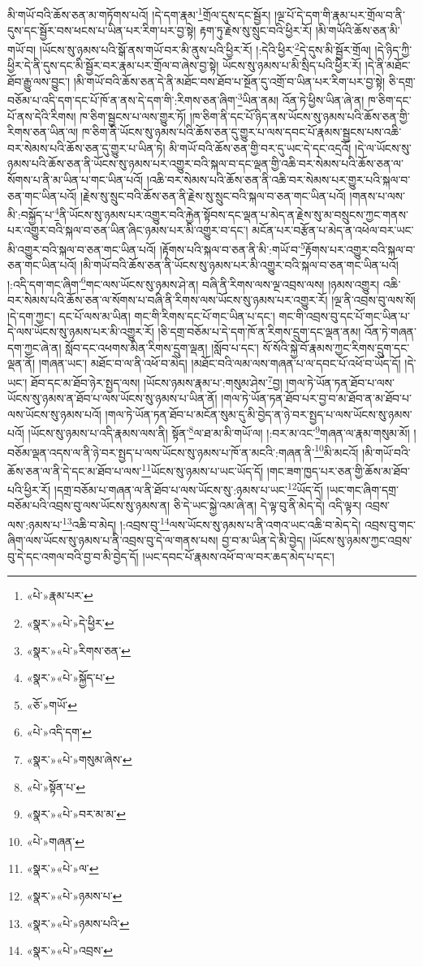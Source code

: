 མི་གཡོ་བའི་ཆོས་ཅན་མ་གཏོགས་པའོ། །དེ་དག་རྣམ་\footnote{«པེ་»རྣམ་པར་}གྲོལ་དུས་དང་སྦྱོར། །ལྔ་པོ་དེ་དག་གི་རྣམ་པར་གྲོལ་བ་ནི་དུས་དང་སྦྱོར་བས་ཕངས་པ་ཡིན་པར་རིག་པར་བྱ་སྟེ། རྟག་ཏུ་རྗེས་སུ་སྲུང་བའི་ཕྱིར་རོ། །མི་གཡོའི་ཆོས་ཅན་མི་གཡོ་བ། །ཡོངས་སུ་ཉམས་པའི་སྒོ་ནས་གཡོ་བར་མི་ནུས་པའི་ཕྱིར་རོ། །:དེའི་ཕྱིར་\footnote{«སྣར་»«པེ་»དེ་ཕྱིར་}དེ་དུས་མི་སྦྱོར་གྲོལ། །དེ་ཉིད་ཀྱི་ཕྱིར་དེ་ནི་དུས་དང་མི་སྦྱོར་བར་རྣམ་པར་གྲོལ་བ་ཞེས་བྱ་སྟེ། ཡོངས་སུ་ཉམས་པ་མི་སྲིད་པའི་ཕྱིར་རོ། །དེ་ནི་མཐོང་ཐོབ་རྒྱུ་ལས་བྱུང་། །མི་གཡོ་བའི་ཆོས་ཅན་དེ་ནི་མཐོང་བས་ཐོབ་པ་སྔོན་དུ་འགྲོ་བ་ཡིན་པར་རིག་པར་བྱ་སྟེ། ཅི་དགྲ་བཅོམ་པ་འདི་དག་དང་པོ་ཁོ་ན་ནས་དེ་དག་གི་:རིགས་ཅན་ཞིག་\footnote{«སྣར་»«པེ་»རིགས་ཅན་}ཡིན་ནམ། འོན་ཏེ་ཕྱིས་ཡིན་ཞེ་ན། ཁ་ཅིག་དང་པོ་ནས་དེའི་རིགས། ཁ་ཅིག་སྦྱངས་པ་ལས་གྱུར་ཏོ། །ཁ་ཅིག་ནི་དང་པོ་ཉིད་ནས་ཡོངས་སུ་ཉམས་པའི་ཆོས་ཅན་གྱི་རིགས་ཅན་ཡིན་ལ། ཁ་ཅིག་ནི་ཡོངས་སུ་ཉམས་པའི་ཆོས་ཅན་དུ་གྱུར་པ་ལས་དབང་པོ་རྣམས་སྦྱངས་པས་འཆི་བར་སེམས་པའི་ཆོས་ཅན་དུ་གྱུར་པ་ཡིན་ཏེ། མི་གཡོ་བའི་ཆོས་ཅན་གྱི་བར་དུ་ཡང་དེ་དང་འདྲའོ། །དེ་ལ་ཡོངས་སུ་ཉམས་པའི་ཆོས་ཅན་ནི་ཡོངས་སུ་ཉམས་པར་འགྱུར་བའི་སྐལ་བ་དང་ལྡན་གྱི་འཆི་བར་སེམས་པའི་ཆོས་ཅན་ལ་སོགས་པ་ནི་མ་ཡིན་པ་གང་ཡིན་པའོ། །འཆི་བར་སེམས་པའི་ཆོས་ཅན་ནི་འཆི་བར་སེམས་པར་གྱུར་པའི་སྐལ་བ་ཅན་གང་ཡིན་པའོ། །རྗེས་སུ་སྲུང་བའི་ཆོས་ཅན་ནི་རྗེས་སུ་སྲུང་བའི་སྐལ་བ་ཅན་གང་ཡིན་པའོ། །གནས་པ་ལས་མི་:བསྐྱོད་པ་\footnote{«སྣར་»«པེ་»སྐྱོད་པ་}ནི་ཡོངས་སུ་ཉམས་པར་འགྱུར་བའི་རྐྱེན་སྟོབས་དང་ལྡན་པ་མེད་ན་རྗེས་སུ་མ་བསྲུངས་ཀྱང་གནས་པར་འགྱུར་བའི་སྐལ་བ་ཅན་ཡིན་ཞིང་ཉམས་པར་མི་འགྱུར་བ་དང་། མངོན་པར་བརྩོན་པ་མེད་ན་འཕེལ་བར་ཡང་མི་འགྱུར་བའི་སྐལ་བ་ཅན་གང་ཡིན་པའོ། །རྟོགས་པའི་སྐལ་བ་ཅན་ནི་མི་:གཡོ་བ་\footnote{«ཅོ་»གཡོ་}རྟོགས་པར་འགྱུར་བའི་སྐལ་བ་ཅན་གང་ཡིན་པའོ། །མི་གཡོ་བའི་ཆོས་ཅན་ནི་ཡོངས་སུ་ཉམས་པར་མི་འགྱུར་བའི་སྐལ་བ་ཅན་གང་ཡིན་པའོ། །:འདི་དག་གང་ཞིག་\footnote{«པེ་»འདི་དག་}གང་ལས་ཡོངས་སུ་ཉམས་ཤེ་ན། བཞི་ནི་རིགས་ལས་ལྔ་འབྲས་ལས། །ཉམས་འགྱུར། འཆི་བར་སེམས་པའི་ཆོས་ཅན་ལ་སོགས་པ་བཞི་ནི་རིགས་ལས་ཡོངས་སུ་ཉམས་པར་འགྱུར་རོ། །ལྔ་ནི་འབྲས་བུ་ལས་སོ། །དེ་དག་ཀྱང་། དང་པོ་ལས་མ་ཡིན། གང་གི་རིགས་དང་པོ་གང་ཡིན་པ་དང་། གང་གི་འབྲས་བུ་དང་པོ་གང་ཡིན་པ་དེ་ལས་ཡོངས་སུ་ཉམས་པར་མི་འགྱུར་རོ། །ཅི་དགྲ་བཅོམ་པ་དེ་དག་ཁོ་ན་རིགས་དྲུག་དང་ལྡན་ནམ། འོན་ཏེ་གཞན་དག་ཀྱང་ཞེ་ན། སློབ་དང་འཕགས་མིན་རིགས་དྲུག་ལྡན། །སློབ་པ་དང་། སོ་སོའི་སྐྱེ་བོ་རྣམས་ཀྱང་རིགས་དྲུག་དང་ལྡན་ནོ། །གཞན་ཡང་། མཐོང་བ་ལ་ནི་འཕོ་བ་མེད། །མཐོང་བའི་ལམ་ལས་གཞན་པ་ལ་དབང་པོ་འཕོ་བ་ཡོད་དོ། །དེ་ཡང་། ཐོབ་དང་མ་ཐོབ་ཉེར་སྤྱད་ལས། །ཡོངས་ཉམས་རྣམ་པ་:གསུམ་ཤེས་\footnote{«སྣར་»«པེ་»གསུམ་ཞེས་}བྱ། །གལ་ཏེ་ཡོན་ཏན་ཐོབ་པ་ལས་ཡོངས་སུ་ཉམས་ན་ཐོབ་པ་ལས་ཡོངས་སུ་ཉམས་པ་ཡིན་ནོ། །གལ་ཏེ་ཡོན་ཏན་ཐོབ་པར་བྱ་བ་མ་ཐོབ་ན་མ་ཐོབ་པ་ལས་ཡོངས་སུ་ཉམས་པའོ། །གལ་ཏེ་ཡོན་ཏན་ཐོབ་པ་མངོན་སུམ་དུ་མི་བྱེད་ན་ཉེ་བར་སྤྱད་པ་ལས་ཡོངས་སུ་ཉམས་པའོ། །ཡོངས་སུ་ཉམས་པ་འདི་རྣམས་ལས་ནི། སྟོན་\footnote{«པེ་»སྟོན་པ་}ལ་ཐ་མ་མི་གཡོ་ལ། །:བར་མ་འང་\footnote{«སྣར་»«པེ་»བར་མ་མ་}གཞན་ལ་རྣམ་གསུམ་མོ། །བཅོམ་ལྡན་འདས་ལ་ནི་ཉེ་བར་སྤྱད་པ་ལས་ཡོངས་སུ་ཉམས་པ་ཁོ་ན་མངའི་:གཞན་ནི་\footnote{«པེ་»གཞན་}མི་མངའོ། །མི་གཡོ་བའི་ཆོས་ཅན་ལ་ནི་དེ་དང་མ་ཐོབ་པ་ལས་\footnote{«སྣར་»«པེ་»ལ་}ཡོངས་སུ་ཉམས་པ་ཡང་ཡོད་དོ། །གང་ཟག་ཁྱད་པར་ཅན་གྱི་ཆོས་མ་ཐོབ་པའི་ཕྱིར་རོ། །དགྲ་བཅོམ་པ་གཞན་ལ་ནི་ཐོབ་པ་ལས་ཡོངས་སུ་:ཉམས་པ་ཡང་\footnote{«སྣར་»«པེ་»ཉམས་པ་}ཡོད་དོ། །ཡང་གང་ཞིག་དགྲ་བཅོམ་པའི་འབྲས་བུ་ལས་ཡོངས་སུ་ཉམས་ན། ཅི་དེ་ཡང་སྐྱེ་འམ་ཞེ་ན། དེ་ལྟ་བུ་ནི་མེད་དེ། འདི་ལྟར། འབྲས་ལས་:ཉམས་པ་\footnote{«སྣར་»«པེ་»ཉམས་པའི་}འཆི་བ་མེད། །:འབྲས་བུ་\footnote{«སྣར་»«པེ་»འབྲས་}ལས་ཡོངས་སུ་ཉམས་པ་ནི་འགའ་ཡང་འཆི་བ་མེད་དེ། འབྲས་བུ་གང་ཞིག་ལས་ཡོངས་སུ་ཉམས་པ་ནི་འབྲས་བུ་དེ་ལ་གནས་པས། བྱ་བ་མ་ཡིན་དེ་མི་བྱེད། །ཡོངས་སུ་ཉམས་ཀྱང་འབྲས་བུ་དེ་དང་འགལ་བའི་བྱ་བ་མི་བྱེད་དོ། །ཡང་དབང་པོ་རྣམས་འཕོ་བ་ལ་བར་ཆད་མེད་པ་དང་། 